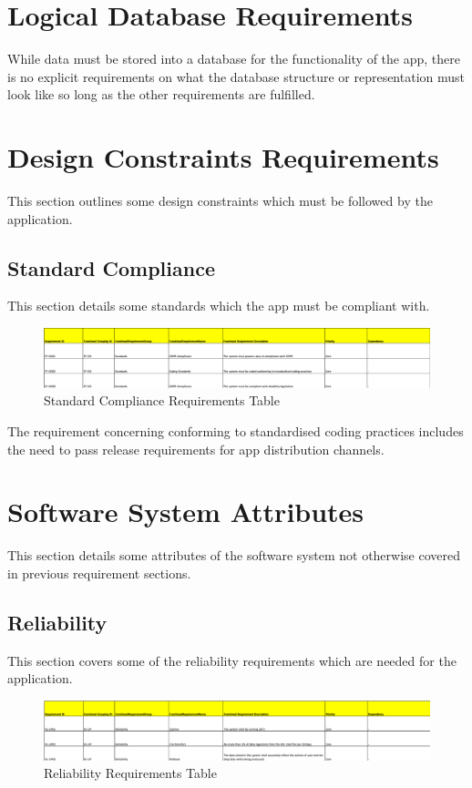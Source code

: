 \documentclass{scrreprt}
\begin{document}
\section{Logical Database Requirements}
While data must be stored into a database for the functionality of the app, there is no explicit requirements on what the database structure or representation must look like so long as the other requirements are fulfilled.


\section{Design Constraints Requirements}
This section outlines some design constraints which must be followed by the application.

\subsection{Standard Compliance}
This section details some standards which the app must be compliant with.\begin{figure}[H]
\centering
\includegraphics[page=1, width=0.95\linewidth]{COMP30830-StandardsRequirements}
\caption{Standard Compliance Requirements Table}
\label{DR}
\end{figure}
The requirement concerning conforming to standardised coding practices includes the need to pass release requirements for app distribution channels.

\section{Software System Attributes}
This section details some attributes of the software system not otherwise covered in previous requirement sections.
\\

\subsection{Reliability}
This section covers some of the reliability requirements which are needed for the application.
\begin{figure}[H]
	\centering
	\includegraphics[page=1, width=0.95\linewidth]{COMP30830-ReliabilityRequirements}
	\caption{Reliability Requirements Table}
	\label{RR}
\end{figure}
\end{document}

